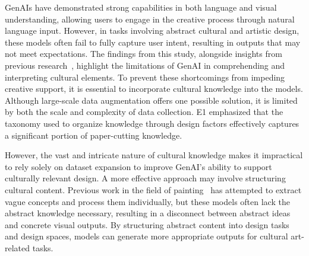 GenAIs have demonstrated strong capabilities in both language and visual understanding, allowing users to engage in the creative process through natural language input. However, in tasks involving abstract cultural and artistic design, these models often fail to fully capture user intent, resulting in outputs that may not meet expectations. The findings from this study, alongside insights from previous research~\cite{Messer:2024:cocreating, Garcia:2024:paradox, Chung:2023:artinter}, highlight the limitations of GenAI in comprehending and interpreting cultural elements. To prevent these shortcomings from impeding creative support, it is essential to incorporate cultural knowledge into the models. Although large-scale data augmentation offers one possible solution, it is limited by both the scale and complexity of data collection.
E1 emphasized that the taxonomy used to organize knowledge through design factors effectively captures a significant portion of paper-cutting knowledge. 

However, the vast and intricate nature of cultural knowledge makes it impractical to rely solely on dataset expansion to improve GenAI's ability to support culturally relevant design. A more effective approach may involve structuring cultural content. Previous work in the field of painting~\cite{Chung:2023:promptpaint} has attempted to extract vague concepts and process them individually, but these models often lack the abstract knowledge necessary, resulting in a disconnect between abstract ideas and concrete visual outputs. By structuring abstract content into design tasks and design spaces, models can generate more appropriate outputs for cultural art-related tasks.

